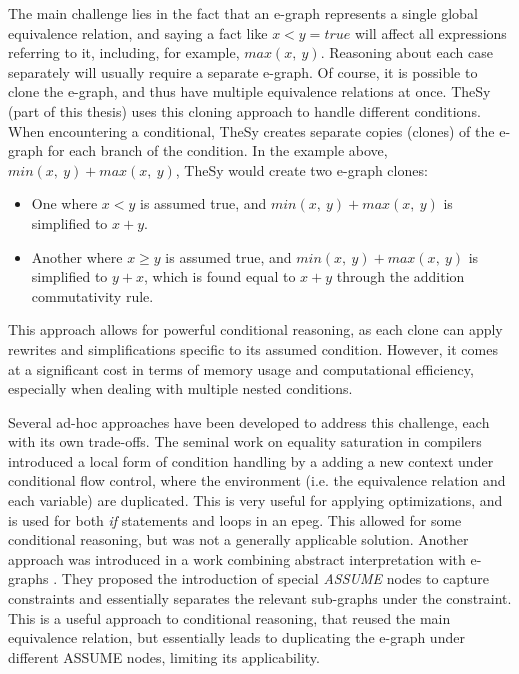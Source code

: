 The main challenge lies in the fact that an e-graph represents a single global equivalence relation, and saying a fact like $x < y = true$ will affect all expressions referring to it, including, for example, $max(x,~y)$.
Reasoning about each case separately will usually require a separate e-graph.
Of course, it is possible to clone the e-graph,
and thus have multiple equivalence relations at once.
TheSy \cite{thesy} (part of this thesis) uses this cloning approach to handle different conditions. 
When encountering a conditional, TheSy creates separate copies (clones) of the e-graph for each branch of the condition.
In the example above, $min(x,~y) + max(x,~y)$, TheSy would create two e-graph clones:
\begin{itemize}
    \item One where $x < y$ is assumed true, and $min(x,~y) + max(x,~y)$ is simplified to $x + y$.
    \item Another where $x \geq y$ is assumed true, and $min(x,~y) + max(x,~y)$ is simplified to $y + x$, which is found equal to $x + y$ through the addition commutativity rule.
\end{itemize}

This approach allows for powerful conditional reasoning, as each clone can apply rewrites and simplifications specific to its assumed condition. 
However, it comes at a significant cost in terms of memory usage and computational efficiency, especially when dealing with multiple nested conditions.

Several ad-hoc approaches have been developed to address this challenge, each with its own trade-offs.
The seminal work on equality saturation in compilers~\cite{eqsat} introduced a local form of condition handling by a adding a new context under conditional flow control, where the environment (i.e. the equivalence relation and each variable) are duplicated.
This is very useful for applying optimizations, and is used for both \textit{if} statements and loops in an \gls{epeg}.
This allowed for some conditional reasoning, but was not a generally applicable solution.
Another approach was introduced in a work combining abstract interpretation with e-graphs \cite{abstracteqsat}.
They proposed the introduction of special \emph{ASSUME} nodes to capture constraints and essentially separates the relevant sub-graphs under the constraint.
This is a useful approach to conditional reasoning, that reused the main equivalence relation, but essentially leads to duplicating the e-graph under different ASSUME nodes, limiting its applicability.


